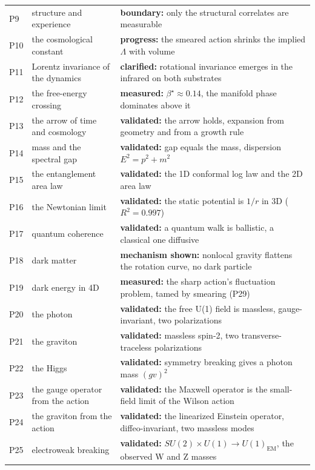 {\begin{longtable}{>{\raggedright}p{} >{\raggedright}p{} >{\raggedright\arraybackslash}p{}}
P9 & structure and experience & \textbf{boundary:} only the structural correlates are measurable \\
P10 & the cosmological constant & \textbf{progress:} the smeared action shrinks the implied $\Lambda$ with volume \\
P11 & Lorentz invariance of the dynamics & \textbf{clarified:} rotational invariance emerges in the infrared on both substrates \\
P12 & the free-energy crossing & \textbf{measured:} $\beta^\star \approx 0.14$, the manifold phase dominates above it \\
P13 & the arrow of time and cosmology & \textbf{validated:} the arrow holds, expansion from geometry and from a growth rule \\
P14 & mass and the spectral gap & \textbf{validated:} gap equals the mass, dispersion $E^2 = p^2 + m^2$ \\
P15 & the entanglement area law & \textbf{validated:} the 1D conformal log law and the 2D area law \\
P16 & the Newtonian limit & \textbf{validated:} the static potential is $1/r$ in 3D ($R^2 = 0.997$) \\
P17 & quantum coherence & \textbf{validated:} a quantum walk is ballistic, a classical one diffusive \\
P18 & dark matter & \textbf{mechanism shown:} nonlocal gravity flattens the rotation curve, no dark particle \\
P19 & dark energy in 4D & \textbf{measured:} the sharp action's fluctuation problem, tamed by smearing (P29) \\
P20 & the photon & \textbf{validated:} the free U(1) field is massless, gauge-invariant, two polarizations \\
P21 & the graviton & \textbf{validated:} massless spin-2, two transverse-traceless polarizations \\
P22 & the Higgs & \textbf{validated:} symmetry breaking gives a photon mass $(gv)^2$ \\
P23 & the gauge operator from the action & \textbf{validated:} the Maxwell operator is the small-field limit of the Wilson action \\
P24 & the graviton from the action & \textbf{validated:} the linearized Einstein operator, diffeo-invariant, two massless modes \\
P25 & electroweak breaking & \textbf{validated:} $SU(2)\times U(1) \to U(1)_{\mathrm{EM}}$, the observed W and Z masses \\

\end{longtable}}
